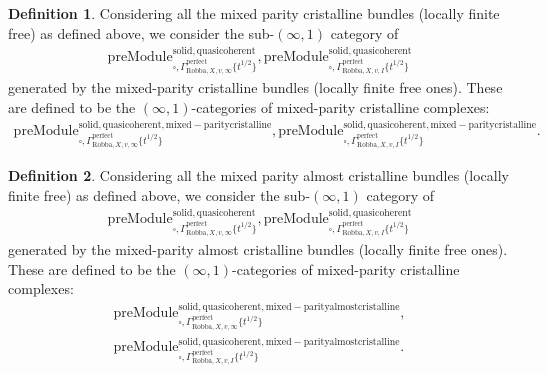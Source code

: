 \documentclass[12pt]{book}
\theoremstyle{definition}
\newtheorem{definition}{Definition}
\begin{document}
\begin{definition}
Considering all the mixed parity cristalline bundles (locally finite free) as defined above, we consider the sub-$(\infty,1)$ category of 
\begin{align}
\mathrm{preModule}^\mathrm{solid,quasicoherent}_{\square,\Gamma^\mathrm{perfect}_{\text{Robba},X,v,\infty}\{t^{1/2}\}},
\mathrm{preModule}^\mathrm{solid,quasicoherent}_{\square,\Gamma^\mathrm{perfect}_{\text{Robba},X,v,I}\{t^{1/2}\}} 
\end{align}
generated by the mixed-parity cristalline bundles (locally finite free ones). These are defined to be the $(\infty,1)$-categories of mixed-parity cristalline complexes:
\begin{align}
\mathrm{preModule}^\mathrm{solid,quasicoherent,mixed-paritycristalline}_{\square,\Gamma^\mathrm{perfect}_{\text{Robba},X,v,\infty}\{t^{1/2}\}},
\mathrm{preModule}^\mathrm{solid,quasicoherent,mixed-paritycristalline}_{\square,\Gamma^\mathrm{perfect}_{\text{Robba},X,v,I}\{t^{1/2}\}}. 
\end{align}
\end{definition}


\begin{definition}
Considering all the mixed parity almost cristalline bundles (locally finite free) as defined above, we consider the sub-$(\infty,1)$ category of 
\begin{align}
\mathrm{preModule}^\mathrm{solid,quasicoherent}_{\square,\Gamma^\mathrm{perfect}_{\text{Robba},X,v,\infty}\{t^{1/2}\}},
\mathrm{preModule}^\mathrm{solid,quasicoherent}_{\square,\Gamma^\mathrm{perfect}_{\text{Robba},X,v,I}\{t^{1/2}\}} 
\end{align}
generated by the mixed-parity almost cristalline bundles (locally finite free ones). These are defined to be the $(\infty,1)$-categories of mixed-parity cristalline complexes:
\begin{align}
\mathrm{preModule}^\mathrm{solid,quasicoherent,mixed-parityalmostcristalline}_{\square,\Gamma^\mathrm{perfect}_{\text{Robba},X,v,\infty}\{t^{1/2}\}},\\
\mathrm{preModule}^\mathrm{solid,quasicoherent,mixed-parityalmostcristalline}_{\square,\Gamma^\mathrm{perfect}_{\text{Robba},X,v,I}\{t^{1/2}\}}. 
\end{align}
\end{definition}
\end{document}
